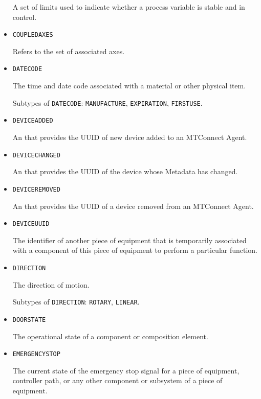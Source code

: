 \begin{itemize}
A set of limits used to indicate whether a process variable is stable and in control.


\item \texttt{COUPLED\textunderscore AXES}  

Refers to the set of associated axes.


\item \texttt{DATE\textunderscore CODE}  

The time and date code associated with a material or other physical item.

Subtypes of \texttt{DATE\textunderscore CODE}: \texttt{MANUFACTURE}, \texttt{EXPIRATION}, \texttt{FIRST\textunderscore USE}.

\item \texttt{DEVICE\textunderscore ADDED}  

An  that provides the \gls{UUID} of new device added to an \gls{MTConnect Agent}.


\item \texttt{DEVICE\textunderscore CHANGED}  

An  that provides the \gls{UUID} of the device whose \gls{Metadata} has changed.


\item \texttt{DEVICE\textunderscore REMOVED}  

An  that provides the \gls{UUID} of a device removed from an \gls{MTConnect Agent}.


\item \texttt{DEVICE\textunderscore UUID}  

The identifier of another piece of equipment that is temporarily associated with a component of this piece of equipment to perform a particular function.


\item \texttt{DIRECTION}  

The direction of motion.

Subtypes of \texttt{DIRECTION}: \texttt{ROTARY}, \texttt{LINEAR}.

\item \texttt{DOOR\textunderscore STATE}  

The operational state of a  component or composition element.


\item \texttt{EMERGENCY\textunderscore STOP}  

The current state of the emergency stop signal for a piece of equipment, controller path, or any other component or subsystem of a piece of equipment.



\end{itemize}
